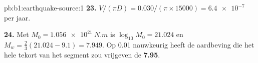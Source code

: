 \begin{solution}{pb:b1:earthquake-source:1}
\textbf{23.} $V/(\pi D) = \num{0.030}/(\pi\times\num{15000}) = \num{6.4e-7}$ per jaar.

\textbf{24.} Met $M_0 = \qty{1.056e21}{N.m}$ is $\log_{10}M_0 = 21.024$ en
$M_w = \tfrac23(21.024 - 9.1) = 7.949$. Op 0.01 nauwkeurig heeft de aardbeving die het
hele tekort van het segment zou vrijgeven de  \textbf{7.95}.
\end{solution}
